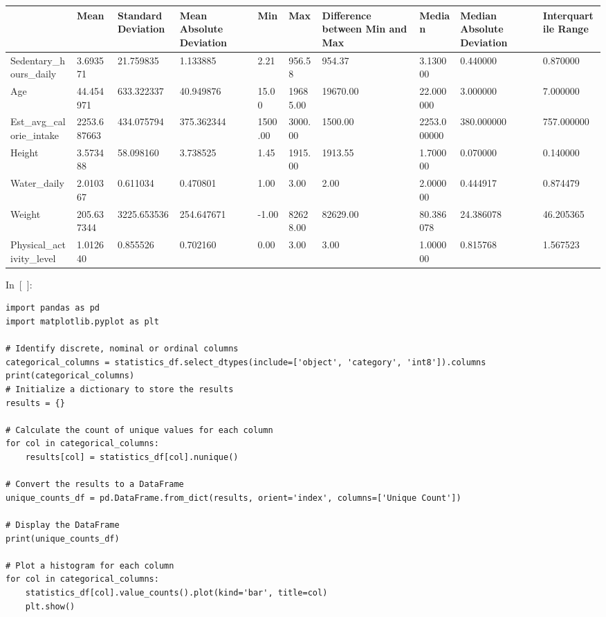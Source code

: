 \documentclass[
  english,
]{article}
\begin{document}
\begin{longtable}[]{@{}llllllllll@{}}
\toprule
& Mean & Standard Deviation & Mean Absolute Deviation & Min & Max &
Difference between Min and Max & Median & Median Absolute Deviation &
Interquartile Range\tabularnewline
\midrule
\endhead
Sedentary\_hours\_daily & 3.693571 & 21.759835 & 1.133885 & 2.21 &
956.58 & 954.37 & 3.130000 & 0.440000 & 0.870000\tabularnewline
Age & 44.454971 & 633.322337 & 40.949876 & 15.00 & 19685.00 & 19670.00 &
22.000000 & 3.000000 & 7.000000\tabularnewline
Est\_avg\_calorie\_intake & 2253.687663 & 434.075794 & 375.362344 &
1500.00 & 3000.00 & 1500.00 & 2253.000000 & 380.000000 &
757.000000\tabularnewline
Height & 3.573488 & 58.098160 & 3.738525 & 1.45 & 1915.00 & 1913.55 &
1.700000 & 0.070000 & 0.140000\tabularnewline
Water\_daily & 2.010367 & 0.611034 & 0.470801 & 1.00 & 3.00 & 2.00 &
2.000000 & 0.444917 & 0.874479\tabularnewline
Weight & 205.637344 & 3225.653536 & 254.647671 & -1.00 & 82628.00 &
82629.00 & 80.386078 & 24.386078 & 46.205365\tabularnewline
Physical\_activity\_level & 1.012640 & 0.855526 & 0.702160 & 0.00 & 3.00
& 3.00 & 1.000000 & 0.815768 & 1.567523\tabularnewline
\bottomrule
\end{longtable}

In~{[}~{]}:

\begin{verbatim}
import pandas as pd
import matplotlib.pyplot as plt

# Identify discrete, nominal or ordinal columns
categorical_columns = statistics_df.select_dtypes(include=['object', 'category', 'int8']).columns
print(categorical_columns)
# Initialize a dictionary to store the results
results = {}

# Calculate the count of unique values for each column
for col in categorical_columns:
    results[col] = statistics_df[col].nunique()

# Convert the results to a DataFrame
unique_counts_df = pd.DataFrame.from_dict(results, orient='index', columns=['Unique Count'])

# Display the DataFrame
print(unique_counts_df)

# Plot a histogram for each column
for col in categorical_columns:
    statistics_df[col].value_counts().plot(kind='bar', title=col)
    plt.show()
\end{verbatim}
\end{document}
